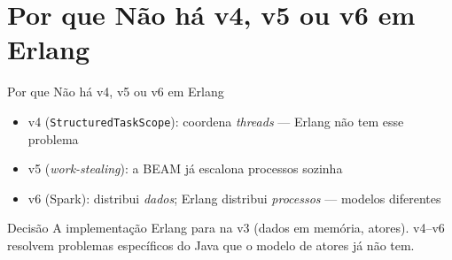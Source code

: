 \section{Por que Não há v4, v5 ou v6 em Erlang}

\begin{frame}{Por que Não há v4, v5 ou v6 em Erlang}
    \begin{itemize}
        \item v4 (\texttt{StructuredTaskScope}): coordena \emph{threads} ---
              Erlang não tem esse problema
        \item v5 (\emph{work-stealing}): a BEAM já escalona processos sozinha
        \item v6 (Spark): distribui \emph{dados}; Erlang distribui
              \emph{processos} --- modelos diferentes
    \end{itemize}

    \vspace{0.5em}
    \begin{block}{Decisão}
        A implementação Erlang para na v3 (dados em memória, atores). v4--v6
        resolvem problemas específicos do Java que o modelo de atores já não tem.
    \end{block}
\end{frame}
